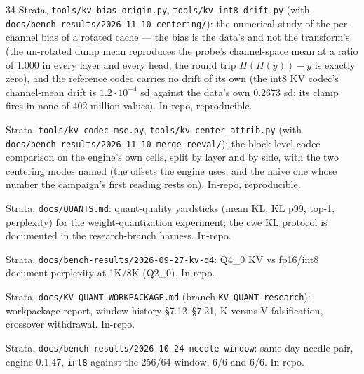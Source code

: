 \documentclass[10pt,twocolumn]{article}
\begin{document}
\begin{thebibliography}{34}
Strata, \texttt{tools/kv\_bias\_origin.py}, \texttt{tools/kv\_int8\_drift.py} (with \texttt{docs/bench-results/2026-11-10-centering/}): the numerical study of the per-channel bias of a rotated cache --- the bias is the data's and not the transform's (the un-rotated dump mean reproduces the probe's channel-space mean at a ratio of 1.000 in every layer and every head, the round trip $H(H(y))-y$ is exactly zero), and the reference codec carries no drift of its own (the int8 KV codec's channel-mean drift is $1.2\cdot10^{-4}$ sd against the data's own $0.2673$ sd; its clamp fires in none of 402 million values). In-repo, reproducible.

Strata, \texttt{tools/kv\_codec\_mse.py}, \texttt{tools/kv\_center\_attrib.py} (with \texttt{docs/bench-results/2026-11-10-merge-reeval/}): the block-level codec comparison on the engine's own cells, split by layer and by side, with the two centering modes named (the offsets the engine uses, and the naive one whose number the campaign's first reading rests on). In-repo, reproducible.

Strata, \texttt{docs/QUANTS.md}: quant-quality yardsticks (mean KL, KL p99, top-1, perplexity) for the weight-quantization experiment; the cwe KL protocol is documented in the research-branch harness. In-repo.

Strata, \texttt{docs/bench-results/2026-09-27-kv-q4}: Q4\_0 KV vs fp16/int8 document perplexity at 1K/8K (Q2\_0). In-repo.

Strata, \texttt{docs/KV\_QUANT\_WORKPACKAGE.md} (branch \texttt{KV\_QUANT\_research}): workpackage report, window history \S7.12--\S7.21, K-versus-V falsification, crossover withdrawal. In-repo.

Strata, \texttt{docs/bench-results/2026-10-24-needle-window}: same-day needle pair, engine 0.1.47, \texttt{int8} against the 256/64 window, 6/6 and 6/6. In-repo.

\end{thebibliography}
\end{document}
